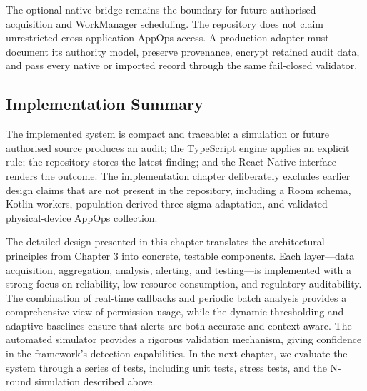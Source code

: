 The optional native bridge remains the boundary for future authorised acquisition and WorkManager scheduling. The repository does not claim unrestricted cross-application AppOps access. A production adapter must document its authority model, preserve provenance, encrypt retained audit data, and pass every native or imported record through the same fail-closed validator.

\subsection{Implementation Summary}

The implemented system is compact and traceable: a simulation or future authorised source produces an audit; the TypeScript engine applies an explicit rule; the repository stores the latest finding; and the React Native interface renders the outcome. The implementation chapter deliberately excludes earlier design claims that are not present in the repository, including a Room schema, Kotlin workers, population-derived three-sigma adaptation, and validated physical-device AppOps collection.

The detailed design presented in this chapter translates the architectural principles from Chapter 3 into concrete, testable components. Each layer—data acquisition, aggregation, analysis, alerting, and testing—is implemented with a strong focus on reliability, low resource consumption, and regulatory auditability. The combination of real-time callbacks and periodic batch analysis provides a comprehensive view of permission usage, while the dynamic thresholding and adaptive baselines ensure that alerts are both accurate and context-aware. The automated simulator provides a rigorous validation mechanism, giving confidence in the framework's detection capabilities. In the next chapter, we evaluate the system through a series of tests, including unit tests, stress tests, and the N-round simulation described above.

